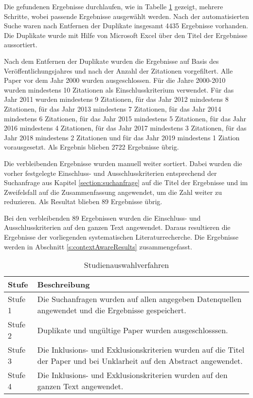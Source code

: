 \documentclass[conference,compsoc]{IEEEtran}
\begin{document}
Die gefundenen Ergebnisse durchlaufen, wie in Tabelle \ref{tabelle:auswahlverfahren} gezeigt, mehrere Schritte, wobei passende Ergebnisse ausgewählt werden. Nach der automatisierten Suche waren nach Entfernen der Duplikate insgesamt 4435 Ergebnisse vorhanden. Die Duplikate wurde mit Hilfe von Microsoft Excel über den Titel der Ergebnisse aussortiert.

Nach dem Entfernen der Duplikate wurden die Ergebnisse auf Basis des Veröffentlichungsjahres und nach der Anzahl der Zitationen vorgefiltert.
Alle Paper vor dem Jahr 2000 wurden ausgeschlossen. Für die Jahre 2000-2010 wurden mindestens 10 Zitationen als Einschlusskriterium verwendet. Für das Jahr 2011 wurden mindestens 9 Zitationen, für das Jahr 2012 mindestens 8 Zitationen, für das Jahr 2013 mindestens 7 Zitationen, für das Jahr 2014 mindestens 6 Zitationen, für das Jahr 2015 mindestens 5 Zitationen, für das Jahr 2016 mindestens 4 Zitationen, für das Jahr 2017 mindestens 3 Zitationen, für das Jahr 2018 mindestens 2 Zitationen und für das Jahr 2019 mindestens 1 Ziation vorausgesetzt. Als Ergebnis blieben 2722 Ergebnisse übrig.

Die verbleibenden Ergebnisse wurden manuell weiter sortiert. Dabei wurden die vorher festgelegte Einschluss- und Ausschlusskriterien entsprechend der Suchanfrage aus Kapitel \ref{section:suchanfrage} auf die Titel der Ergebnisse und im Zweifelsfall auf die Zusammenfassung angewendet, um die Zahl weiter zu reduzieren. Als Resultat blieben 89 Ergebnisse übrig.

Bei den verbleibenden 89 Ergebnissen wurden die Einschluss- und Ausschlusskriterien auf den ganzen Text angewendet. Daraus resultieren die Ergebnisse der vorliegenden systematischen Literaturrecherche. Die Ergebnisse werden in Abschnitt \ref{s:contextAwareResults} zusammengefasst.

\begin{table}[h]
	\caption{Studienauswahlverfahren}
	\label{tabelle:auswahlverfahren}
\begin{tabular}{p{1cm}|p{6.5cm}}

	Stufe & Beschreibung \\
	\hline	
	Stufe 1 & Die Suchanfragen wurden auf allen angegeben Datenquellen angewendet und die Ergebnisse gespeichert.\\
	
	Stufe 2 & Duplikate und ungültige Paper wurden ausgeschlosssen.\\
	
	Stufe 3 & Die Inklusions- und Exklusionskriterien wurden auf die Titel der Paper und bei Unklarheit auf den Abstract angewendet. \\
	
	
	Stufe 4 & Die Inklusions- und Exklusionskriterien wurden auf den ganzen Text angewendet.
	
\end{tabular}
\end{table}
\end{document}
